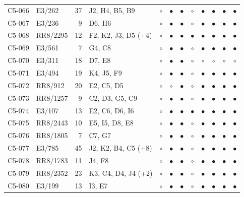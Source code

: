 {\begin{longtable}{llrp{3.9cm}cccccccc}
    C5-066 & E3/262 & 37 & J2, H4, B5, B9 & $\circ$ & $\bullet$ & $\bullet$ & $\circ$ & $\bullet$ & $\bullet$ & $\bullet$ & $\bullet$ \\
    C5-067 & E3/236 & 9 & D6, H6 & $\circ$ & $\bullet$ & $\bullet$ & $\circ$ & $\bullet$ & $\bullet$ & $\bullet$ & $\bullet$ \\
    C5-068 & RR8/2295 & 12 & F2, K2, J3, D5 (+4) & $\circ$ & $\bullet$ & $\bullet$ & $\bullet$ & $\bullet$ & $\bullet$ & $\bullet$ & $\bullet$ \\
    C5-069 & E3/561 & 7 & G4, C8 & $\circ$ & $\bullet$ & $\bullet$ & $\circ$ & $\bullet$ & $\bullet$ & $\bullet$ & $\bullet$ \\
    C5-070 & E3/311 & 18 & D7, E8 & $\circ$ & $\bullet$ & $\bullet$ & $\circ$ & $\circ$ & $\circ$ & $\circ$ & $\circ$ \\
    C5-071 & E3/494 & 19 & K4, J5, F9 & $\circ$ & $\bullet$ & $\bullet$ & $\circ$ & $\bullet$ & $\bullet$ & $\bullet$ & $\bullet$ \\
    C5-072 & RR8/912 & 20 & E2, C5, D5 & $\circ$ & $\circ$ & $\bullet$ & $\circ$ & $\bullet$ & $\bullet$ & $\bullet$ & $\bullet$ \\
    C5-073 & RR8/1257 & 9 & C2, D3, G5, C9 & $\circ$ & $\bullet$ & $\bullet$ & $\circ$ & $\bullet$ & $\bullet$ & $\bullet$ & $\bullet$ \\
    C5-074 & E3/107 & 13 & E2, C6, D6, I6 & $\circ$ & $\bullet$ & $\bullet$ & $\bullet$ & $\bullet$ & $\bullet$ & $\bullet$ & $\bullet$ \\
    C5-075 & RR8/2443 & 10 & E5, I5, D8, E8 & $\circ$ & $\bullet$ & $\bullet$ & $\circ$ & $\bullet$ & $\bullet$ & $\bullet$ & $\bullet$ \\
    C5-076 & RR8/1805 & 7 & C7, G7 & $\circ$ & $\bullet$ & $\bullet$ & $\circ$ & $\bullet$ & $\bullet$ & $\bullet$ & $\bullet$ \\
    C5-077 & E3/785 & 45 & J2, K2, B4, C5 (+8) & $\circ$ & $\bullet$ & $\bullet$ & $\circ$ & $\bullet$ & $\bullet$ & $\bullet$ & $\bullet$ \\
    C5-078 & RR8/1783 & 11 & J4, F8 & $\circ$ & $\bullet$ & $\bullet$ & $\circ$ & $\bullet$ & $\bullet$ & $\bullet$ & $\bullet$ \\
    C5-079 & RR8/2352 & 23 & K3, C4, D4, J4 (+2) & $\circ$ & $\bullet$ & $\bullet$ & $\circ$ & $\bullet$ & $\bullet$ & $\bullet$ & $\bullet$ \\
    C5-080 & E3/199 & 13 & I3, E7 & $\circ$ & $\bullet$ & $\bullet$ & $\circ$ & $\bullet$ & $\bullet$ & $\bullet$ & $\bullet$ \\

\end{longtable}}
